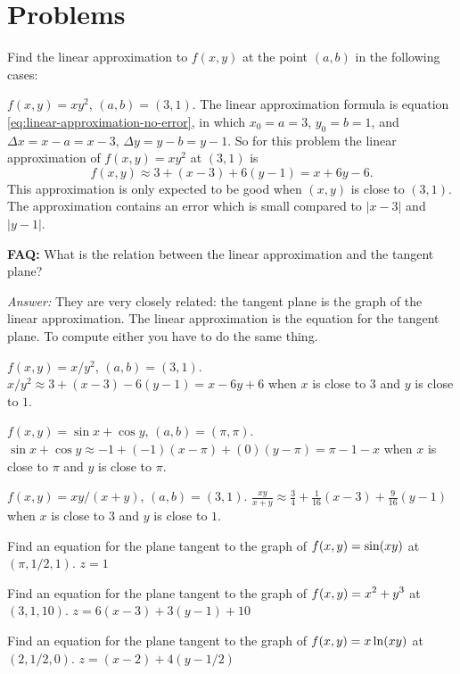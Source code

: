\section{Problems}
\begin{multicols}{2}\problemfont

\problem Find the linear approximation to $f(x, y)$ at the point 
$(a,b)$ in the following cases:

\subprob $f(x, y) = xy^2$, $(a, b) = (3,1)$.
\answer
The linear approximation formula is equation
\eqref{eq:linear-approximation-no-error}, in which $x_0 = a = 3$,
$y_0 = b= 1$, and $\Delta x = x-a = x-3$, $\Delta y = y-b = y-1$.  So
for this problem the linear approximation of $f(x,y) = xy^2$ at
$(3,1)$ is
\[
f(x, y) \approx 3 + (x-3) + 6 (y-1) = x+6y-6.
\]
This approximation is only expected to be good when $(x,y)$ is close
to $(3,1)$.  The approximation contains an error which is small
compared to $|x-3|$ and $|y-1|$. 

\noindent
\textbf{FAQ:} What is the relation between the linear approximation
and the tangent plane?

\noindent\textit{Answer:} They are very closely related: the tangent
plane is the graph of the linear approximation. The linear
approximation is the equation for the tangent plane.  To compute
either you have to do the same thing.

\endanswer

\subprob $f(x, y) = x/y^2$, $(a, b) = (3,1)$.
\answer
$x/y^2 \approx 3 + (x-3) - 6 (y-1) = x-6y+6$ when $x$ is close to $3$
and $y$ is close to $1$.
\endanswer

\subprob $f(x, y) = \sin x+ \cos y$, $(a, b) = (\pi,\pi)$.
\answer
$\sin x + \cos y \approx -1 + (-1)(x-\pi) + (0)(y-\pi) = \pi-1-x$ when
$x$ is close to $\pi$ and $y$ is close to $\pi$.
\endanswer


\subprob $f(x, y) = xy/(x+y)$, $(a, b) = (3,1)$.
\answer
$\frac{xy}{x+y} \approx \frac34 + \frac{1}{16}(x-3) + \frac 9 {16}(y-1)$
 when $x$ is close to $3$ and $y$ is close to $1$.
\endanswer

\problem Find an equation for the plane tangent to the graph of $\displaystyle 
f(x,y)=\sin(xy)$ at $(\pi,1/2,1)$. 
\answer
$z=1$
\endanswer

\problem Find an equation for the plane tangent to the graph of $\displaystyle 
f(x,y)=x^2+y^3$ at $(3,1,10)$. 
\answer
$z=6(x-3)+3(y-1)+10$
\endanswer

\problem Find an equation for the plane tangent to the graph of $\displaystyle 
f(x,y)=x\ln(xy)$ at $(2,1/2,0)$. 
\label{prb:ln-tan-plane}
\answer
$z=(x-2)+4(y-1/2)$
\endanswer


\end{multicols}
